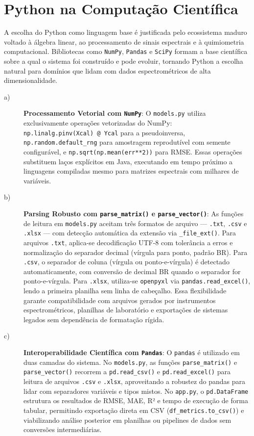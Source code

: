 \section{Python na Computação Científica}

A escolha do Python como linguagem base é justificada pelo ecossistema maduro voltado à
álgebra linear, ao processamento de sinais espectrais e à quimiometria computacional.
Bibliotecas como \texttt{NumPy}, \texttt{Pandas} e \texttt{SciPy} formam a base
científica sobre a qual o sistema foi construído e pode evoluir, tornando Python a
escolha natural para domínios que lidam com dados espectrométricos de alta
dimensionalidade.

\begin{description}

\item[a)] \textbf{Processamento Vetorial com \texttt{NumPy}}: O \texttt{models.py}
utiliza exclusivamente operações vetorizadas do NumPy:
\texttt{np.linalg.pinv(Xcal)~@~Ycal} para a pseudoinversa, \texttt{np.random.default\_rng}
para amostragem reprodutível com semente configurável, e \texttt{np.sqrt(np.mean(err**2))}
para RMSE. Essas operações substituem laços explícitos em Java, executando em tempo próximo
a linguagens compiladas mesmo para matrizes espectrais com milhares de variáveis.

\item[b)] \textbf{Parsing Robusto com \texttt{parse\_matrix()} e \texttt{parse\_vector()}}:
As funções de leitura em \texttt{models.py} aceitam três formatos de arquivo — \texttt{.txt},
\texttt{.csv} e \texttt{.xlsx} — com detecção automática da extensão via \texttt{\_file\_ext()}.
Para arquivos \texttt{.txt}, aplica-se decodificação UTF-8 com tolerância a erros e
normalização do separador decimal (vírgula para ponto, padrão BR). Para \texttt{.csv}, o
separador de coluna (vírgula ou ponto-e-vírgula) é detectado automaticamente, com
conversão de decimal BR quando o separador for ponto-e-vírgula. Para \texttt{.xlsx},
utiliza-se \texttt{openpyxl} via \texttt{pandas.read\_excel()}, lendo a primeira planilha
sem linha de cabeçalho. Essa flexibilidade garante compatibilidade com arquivos gerados
por instrumentos espectrométricos, planilhas de laboratório e exportações de sistemas
legados sem dependência de formatação rígida.

\item[c)] \textbf{Interoperabilidade Científica com \texttt{Pandas}}: O \texttt{pandas}
é utilizado em duas camadas do sistema. No \texttt{models.py}, as funções
\texttt{parse\_matrix()} e \texttt{parse\_vector()} recorrem a \texttt{pd.read\_csv()} e
\texttt{pd.read\_excel()} para leitura de arquivos \texttt{.csv} e \texttt{.xlsx},
aproveitando a robustez do pandas para lidar com separadores variáveis e tipos mistos.
No \texttt{app.py}, o \texttt{pd.DataFrame} estrutura os resultados de RMSE,
MAE, R² e tempo de execução de forma tabular, permitindo exportação direta em CSV
(\texttt{df\_metrics.to\_csv()}) e viabilizando análise posterior em planilhas
ou pipelines de dados sem conversões intermediárias.


\end{description}
